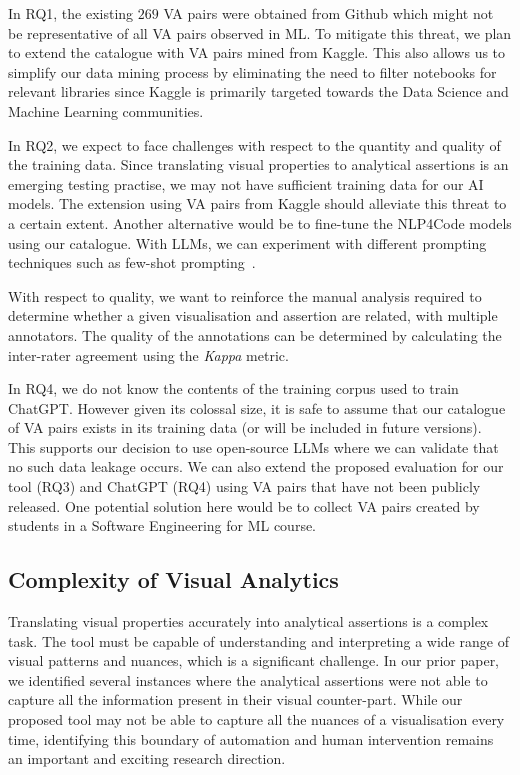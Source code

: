 \documentclass[sigconf]{acmart}
\begin{document}
In RQ1, the existing $269$ VA pairs were obtained from Github which
might not be representative of all VA pairs observed in ML. To
mitigate this threat, we plan to extend the catalogue with VA
pairs mined from Kaggle. This also allows us to simplify our data
mining process by eliminating the need to filter notebooks for
relevant libraries since Kaggle is primarily targeted towards
the Data Science and Machine Learning communities.

In RQ2, we expect to face challenges with respect to the quantity and
quality of the training data. Since translating visual properties to
analytical assertions is an emerging testing practise, we may not have
sufficient training data for our AI models. The extension using VA
pairs from Kaggle should alleviate this threat to a certain extent.
Another alternative would be to fine-tune the NLP4Code models using
our catalogue. With LLMs, we can experiment with different prompting
techniques such as few-shot prompting~\cite{liu2023pretrain}.

With respect to quality, we want to reinforce the manual analysis
required to determine whether a given visualisation and assertion are
related, with multiple annotators. The quality of the annotations can
be determined by calculating the inter-rater agreement using the
\textit{Kappa} metric.

In RQ4, we do not know the contents of the training corpus used to
train ChatGPT. However given its colossal size, it is safe to assume
that our catalogue of VA pairs exists in its training data (or will be
included in future versions). This supports our decision to use
open-source LLMs where we can validate that no such data leakage
occurs. We can also extend the proposed evaluation for our tool (RQ3)
and ChatGPT (RQ4) using VA pairs that have not been publicly released.
One potential solution here would be to collect VA pairs created by
students in a Software Engineering for ML course.

\subsection{Complexity of Visual Analytics}

Translating visual properties accurately into analytical assertions is
a complex task. The tool must be capable of understanding and
interpreting a wide range of visual patterns and nuances, which is
a significant challenge. In our prior paper, we identified several
instances where the analytical assertions were not able to capture all
the information present in their visual counter-part. While our
proposed tool may not be able to capture all the nuances of
a visualisation every time, identifying this boundary of automation
and human intervention remains an important and exciting research
direction.
\end{document}
